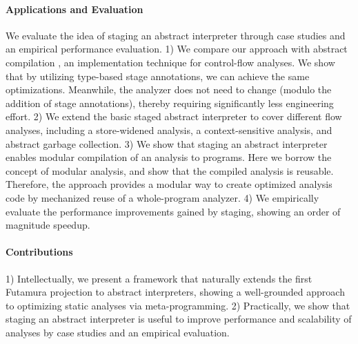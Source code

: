 \paragraph{Applications and Evaluation}
We evaluate the idea of staging an abstract interpreter through
case studies and an empirical performance evaluation.
1) We compare our approach with abstract compilation
\cite{Boucher:1996:ACN:647473.727587}, an implementation technique for
control-flow analyses. We show that by utilizing type-based stage
annotations, we can achieve the same optimizations. Meanwhile,
the analyzer does not need to change (modulo the addition of stage annotations),
thereby requiring significantly less engineering effort.
2) We extend the basic staged abstract interpreter to cover different flow
analyses, including a store-widened analysis, a context-sensitive
analysis, and abstract garbage collection.
3) We show that staging an abstract interpreter enables modular
compilation of an analysis to programs. Here we borrow the concept of
modular analysis, and show that the compiled analysis is reusable.
Therefore, the approach provides a modular way to create optimized
analysis code by mechanized reuse of a whole-program analyzer.
4) We empirically evaluate the performance improvements gained by staging,
showing an order of magnitude speedup.

\paragraph{Contributions} 
1) Intellectually, we present a framework that naturally extends the first
Futamura projection to abstract interpreters, showing a well-grounded approach
to optimizing static analyses via meta-programming.  2) Practically, we show
that staging an abstract interpreter is useful to improve performance and
scalability of analyses by case studies and an empirical evaluation.

